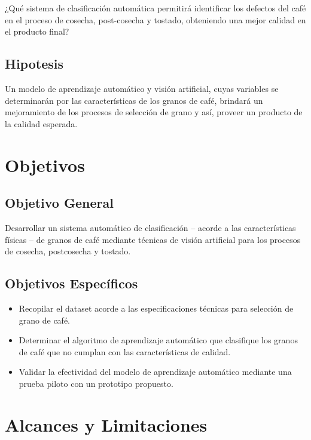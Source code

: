 ¿Qué sistema de clasificación automática permitirá identificar los defectos del café en el proceso de 
cosecha, post-cosecha y tostado, obteniendo una mejor calidad en el producto final?
 
 
\subsection{Hipotesis}

Un modelo de aprendizaje automático y visión artificial, cuyas variables se determinarán por las características de los granos de café, brindará un mejoramiento de los procesos de selección de grano y así, proveer un producto de la calidad esperada. 

 
\section{Objetivos}


\subsection{Objetivo General}

Desarrollar un sistema automático de clasificación \--- acorde a las características físicas \--- de granos de café mediante técnicas de visión artificial para los procesos de cosecha, postcosecha y tostado.\medskip


\subsection{Objetivos Específicos}
\begin{itemize}
    \item Recopilar el dataset acorde a las especificaciones técnicas para selección de grano de café.

    \item Determinar el algoritmo de aprendizaje automático que clasifique los granos de café que no cumplan con las características de calidad.
    
    \item Validar la efectividad del modelo de aprendizaje automático mediante una prueba piloto con un prototipo propuesto.
\end{itemize}
	
\section{Alcances y Limitaciones}

